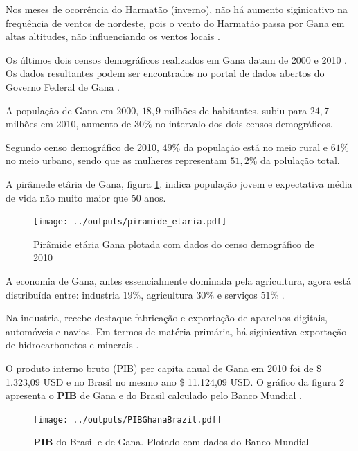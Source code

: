 Nos meses de ocorrência do Harmatão (inverno), não há aumento siginicativo 
na frequência de ventos de nordeste, pois o vento do Harmatão passa por Gana 
em altas altitudes, não influenciando os ventos locais \citep{breuning2005}. 

Os últimos dois censos demográficos realizados em Gana datam
de 2000 \citep{ghanacensus2003} e 2010 \citep{ghanacensus2013}. Os
dados resultantes podem ser encontrados no portal de dados abertos
do Governo Federal de Gana \citep{opendataghana}.

A população de Gana em 2000, $18,9$ milhões de habitantes, subiu para $24,7$ 
milhões em 2010, aumento de $30\%$ no intervalo dos dois censos demográficos.

Segundo censo demográfico de 2010, $49\%$ da população está no meio rural e 
$61\%$ no meio urbano, sendo que as mulheres representam $51,2\%$ da polulação
total.

A pirâmede etâria de Gana, figura \ref{fig:piramedegana}, indica população 
jovem e expectativa média de vida não muito maior que 50 anos. 

\begin{figure}[H]
  \centering
  \texttt{[image: ../outputs/piramide\_etaria.pdf]}
  \caption{Pirâmide etária Gana plotada com dados do censo 
           demográfico de 2010 \citep{ghanacensus2013} \label{fig:piramedegana}}
\end{figure}

A economia de Gana, antes essencialmente dominada pela agricultura, 
agora está distribuída entre: industria $19\%$, agricultura $30\%$ 
e serviços $51\%$ \citep{ghanacensus2013}.

Na industria, recebe destaque fabricação e exportação de aparelhos digitais, 
automóveis e navios. Em termos de matéria primária, há siginicativa 
exportação de hidrocarbonetos e minerais \citep{ghanacensus2013}.

O produto interno bruto (PIB) per capita anual de Gana em 2010 foi
de \$ 1.323,09 USD e no Brasil no mesmo ano \$ 11.124,09 USD.
O gráfico da figura \ref{fg:pib} apresenta o \textbf{PIB} de Gana e do Brasil 
calculado pelo Banco Mundial \citep{bancomundial}.

\begin{figure}[H]
\begin{center}
  \texttt{[image: ../outputs/PIBGhanaBrazil.pdf]}
  \caption{\textbf{PIB} do Brasil e de Gana. Plotado com dados do 
           Banco Mundial \citep{bancomundial} \label{fg:pib}}
\end{center}
\end{figure}

